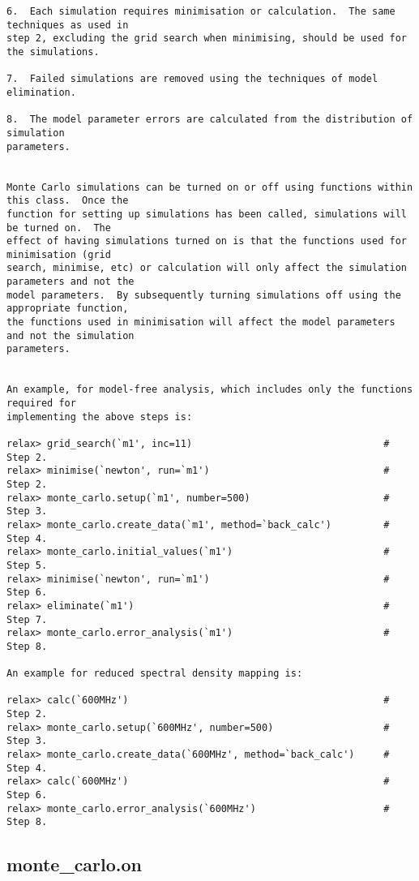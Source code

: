 {\begin{verbatim}
6.  Each simulation requires minimisation or calculation.  The same techniques as used in
step 2, excluding the grid search when minimising, should be used for the simulations.

7.  Failed simulations are removed using the techniques of model elimination.

8.  The model parameter errors are calculated from the distribution of simulation
parameters.


Monte Carlo simulations can be turned on or off using functions within this class.  Once the
function for setting up simulations has been called, simulations will be turned on.  The
effect of having simulations turned on is that the functions used for minimisation (grid
search, minimise, etc) or calculation will only affect the simulation parameters and not the
model parameters.  By subsequently turning simulations off using the appropriate function,
the functions used in minimisation will affect the model parameters and not the simulation
parameters.


An example, for model-free analysis, which includes only the functions required for
implementing the above steps is:

relax> grid_search(`m1', inc=11)                                 # Step 2.
relax> minimise(`newton', run=`m1')                              # Step 2.
relax> monte_carlo.setup(`m1', number=500)                       # Step 3.
relax> monte_carlo.create_data(`m1', method=`back_calc')         # Step 4.
relax> monte_carlo.initial_values(`m1')                          # Step 5.
relax> minimise(`newton', run=`m1')                              # Step 6.
relax> eliminate(`m1')                                           # Step 7.
relax> monte_carlo.error_analysis(`m1')                          # Step 8.

An example for reduced spectral density mapping is:

relax> calc(`600MHz')                                            # Step 2.
relax> monte_carlo.setup(`600MHz', number=500)                   # Step 3.
relax> monte_carlo.create_data(`600MHz', method=`back_calc')     # Step 4.
relax> calc(`600MHz')                                            # Step 6.
relax> monte_carlo.error_analysis(`600MHz')                      # Step 8.
\end{verbatim}
}



\newpage

\subsection{monte\_carlo.on}


